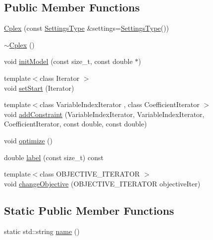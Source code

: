 \subsection*{Public Member Functions}
\begin{DoxyCompactItemize}
\item 
\hyperlink{classnifty_1_1ilp__backend_1_1Cplex_ab9abc60e704f82a5b7d480e4fab2e39f}{Cplex} (const \hyperlink{classnifty_1_1ilp__backend_1_1Cplex_a55f68efdbd0060526e09b037be4e6a49}{Settings\+Type} \&settings=\hyperlink{classnifty_1_1ilp__backend_1_1Cplex_a55f68efdbd0060526e09b037be4e6a49}{Settings\+Type}())
\item 
\hyperlink{classnifty_1_1ilp__backend_1_1Cplex_a5bebd6813a2fbb17fa2b5532c3d21000}{$\sim$\+Cplex} ()
\item 
void \hyperlink{classnifty_1_1ilp__backend_1_1Cplex_a52a0ed3e137e56d17daaaf4542d3290c}{init\+Model} (const size\+\_\+t, const double $\ast$)
\item 
{\footnotesize template$<$class Iterator $>$ }\\void \hyperlink{classnifty_1_1ilp__backend_1_1Cplex_a1c773d38cf7a0434247a87ee96531c57}{set\+Start} (Iterator)
\item 
{\footnotesize template$<$class Variable\+Index\+Iterator , class Coefficient\+Iterator $>$ }\\void \hyperlink{classnifty_1_1ilp__backend_1_1Cplex_ac1aca9700667959bb0d99c55ffec16ed}{add\+Constraint} (Variable\+Index\+Iterator, Variable\+Index\+Iterator, Coefficient\+Iterator, const double, const double)
\item 
void \hyperlink{classnifty_1_1ilp__backend_1_1Cplex_aa0055358a4aef6b8b660c14422500b23}{optimize} ()
\item 
double \hyperlink{classnifty_1_1ilp__backend_1_1Cplex_aded72f7962341ae66e4a72c2ef463015}{label} (const size\+\_\+t) const 
\item 
{\footnotesize template$<$class O\+B\+J\+E\+C\+T\+I\+V\+E\+\_\+\+I\+T\+E\+R\+A\+T\+O\+R $>$ }\\void \hyperlink{classnifty_1_1ilp__backend_1_1Cplex_a38bae82b8a54d28471ceb44514bfba18}{change\+Objective} (O\+B\+J\+E\+C\+T\+I\+V\+E\+\_\+\+I\+T\+E\+R\+A\+T\+O\+R objective\+Iter)
\end{DoxyCompactItemize}
\subsection*{Static Public Member Functions}
\begin{DoxyCompactItemize}
\item 
static std\+::string \hyperlink{classnifty_1_1ilp__backend_1_1Cplex_a35cb51113bf3b858d470f9c742884cdc}{name} ()
\end{DoxyCompactItemize}



